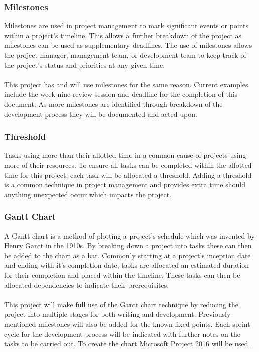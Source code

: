 	\subsubsection{Milestones}
		Milestones are used in project management to mark significant events or points within a project's timeline. This allows a further breakdown of the project as milestones can be used as supplementary deadlines. The use of milestones allows the project manager, management team, or development team to keep track of the project's status and priorities at any given time.
		\\\\
		This project has and will use milestones for the same reason. Current examples include the week nine review session and deadline for the completion of this document. As more milestones are identified through breakdown of the development process they will be documented and acted upon.
	\subsubsection{Threshold}
		Tasks using more than their allotted time in a common cause of projects using more of their resources. To ensure all tasks can be completed within the allotted time for this project, each task will be allocated a threshold. Adding a threshold is a common technique in project management and provides extra time should anything unexpected occur which impacts the project.
	\subsubsection{Gantt Chart}
		A Gantt chart is a method of plotting a project's schedule which was invented by Henry Gantt in the 1910s. By breaking down a project into tasks these can then be added to the chart as a bar. Commonly starting at a project's inception date and ending with it's completion date, tasks are allocated an estimated duration for their completion and placed within the timeline. These tasks can then be allocated dependencies to indicate their prerequisites.
		\\\\
		This project will make full use of the Gantt chart technique by reducing the project into multiple stages for both writing and development. Previously mentioned milestones will also be added for the known fixed points. Each sprint cycle for the development process will be indicated with further notes on the tasks to be carried out. To create the chart Microsoft Project 2016 will be used.

